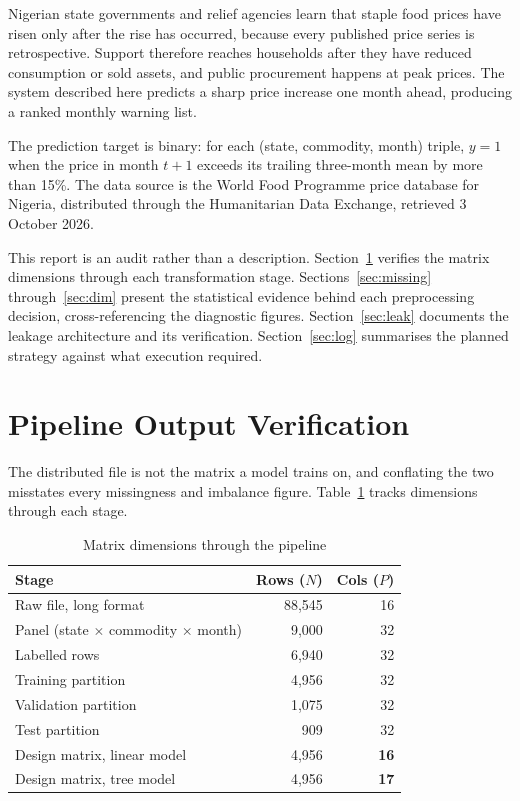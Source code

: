 \documentclass[conference]{IEEEtran}
\begin{document}
Nigerian state governments and relief agencies learn that staple food prices
have risen only after the rise has occurred, because every published price
series is retrospective. Support therefore reaches households after they have
reduced consumption or sold assets, and public procurement happens at peak
prices. The system described here predicts a sharp price increase one month
ahead, producing a ranked monthly warning list.

The prediction target is binary: for each (state, commodity, month) triple,
$y = 1$ when the price in month $t+1$ exceeds its trailing three-month mean by
more than 15\%. The data source is the World Food Programme price database for
Nigeria, distributed through the Humanitarian Data Exchange, retrieved 3
October 2026.

This report is an audit rather than a description. Section~\ref{sec:dims}
verifies the matrix dimensions through each transformation stage.
Sections~\ref{sec:missing} through~\ref{sec:dim} present the statistical
evidence behind each preprocessing decision, cross-referencing the diagnostic
figures. Section~\ref{sec:leak} documents the leakage architecture and its
verification. Section~\ref{sec:log} summarises the planned strategy against
what execution required.

\section{Pipeline Output Verification}
\label{sec:dims}

The distributed file is not the matrix a model trains on, and conflating the
two misstates every missingness and imbalance figure. Table~\ref{tab:dims}
tracks dimensions through each stage.

\begin{table}[htbp]
\caption{Matrix dimensions through the pipeline}
\begin{center}
\begin{tabular}{@{}lrr@{}}
\toprule
\textbf{Stage} & \textbf{Rows ($N$)} & \textbf{Cols ($P$)} \\
\midrule
Raw file, long format & 88{,}545 & 16 \\
Panel (state $\times$ commodity $\times$ month) & 9{,}000 & 32 \\
Labelled rows & 6{,}940 & 32 \\
\midrule
Training partition & 4{,}956 & 32 \\
Validation partition & 1{,}075 & 32 \\
Test partition & 909 & 32 \\
\midrule
Design matrix, linear model & 4{,}956 & \textbf{16} \\
Design matrix, tree model & 4{,}956 & \textbf{17} \\
\bottomrule
\end{tabular}
\label{tab:dims}
\end{center}
\end{table}
\end{document}
